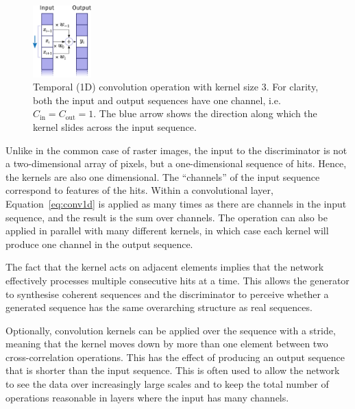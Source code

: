 \begin{figure}
    \centering
    \includegraphics[width=0.20\textwidth]{chapter4/1d_convolution.pdf}
    \caption{Temporal (1D) convolution operation with kernel size 3. For
    clarity, both the input and output sequences have one channel, i.e.\
    $C_\mathrm{in} = C_\mathrm{out} = 1$. The blue arrow shows the direction along
    which the kernel slides across the input sequence.}
    \label{fig:temporal_conv}
\end{figure}


Unlike in the common case of raster images, the input to the discriminator is
not a two-dimensional array of pixels, but a one-dimensional sequence of hits.
Hence, the kernels are also one dimensional. The ``channels'' of the input
sequence correspond to features of the hits. Within a convolutional layer,
Equation~\ref{eq:conv1d} is applied as many times as there are channels in the input
sequence, and the result is the sum over channels. The operation can also be
applied in parallel with many different kernels, in which case each kernel will
produce one channel in the output sequence.


The fact that the kernel acts on adjacent elements implies that the network
effectively processes multiple consecutive hits at a time. This allows the
generator to synthesise coherent sequences and the discriminator to perceive
whether a generated sequence has the same overarching structure as real
sequences.

Optionally, convolution kernels can be applied over the sequence with a stride,
meaning that the kernel moves down by more than one element between two
cross-correlation operations. This has the effect of producing an output
sequence that is shorter than the input sequence. This is often used to allow
the network to see the data over increasingly large scales and to keep the total
number of operations reasonable in layers where the input has many channels.


